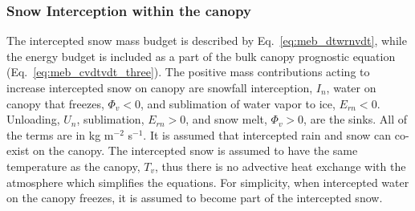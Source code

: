 \subsubsection{Snow Interception within the canopy}
\label{sec:meb_snow_interception}

The intercepted snow mass budget is described by
Eq.~\ref{eq:meb_dtwrnvdt}, while the energy budget is included as a part
of the bulk canopy prognostic equation (Eq.~\ref{eq:meb_cvdtvdt_three}).
The positive mass contributions acting to increase intercepted snow on
canopy are snowfall interception, $I_{n}$, water on canopy that freezes, $\Phi_{v}<0$, and sublimation of
water vapor to ice, $E_{rn}<0$. 
Unloading, $U_{n}$, sublimation, $E_{rn}>0$, and snow melt, $\Phi_{v}>0$, are the sinks. 
All of the terms are in kg m$^{-2}$ s$^{-1}$.
%
It is assumed that intercepted rain and snow can co-exist on the canopy. 
%
The intercepted
snow is assumed to
have the same temperature as the canopy, $T_v$, thus there is no
advective heat exchange with the atmosphere which simplifies the equations.
%
%
%
For simplicity,
when intercepted water on the canopy freezes, it is assumed to become
part of the intercepted snow. 



